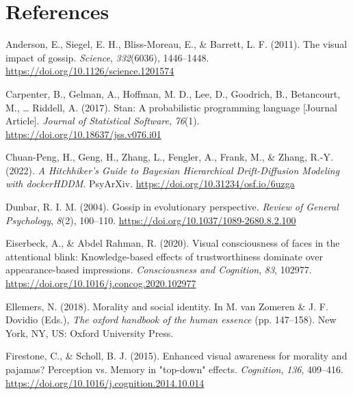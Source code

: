 \documentclass[
  man]{apa6}
\newlength{\cslhangindent}
\newlength{\cslentryspacingunit} %
\newenvironment{CSLReferences}[2] %
 {%
  \setlength{\parindent}{0pt}
  \ifodd #1
  \let\oldpar\par
  \def\par{\hangindent=\cslhangindent\oldpar}
  \fi
  \setlength{\parskip}{#2\cslentryspacingunit}
 }%
 {}
\begin{document}
\hypertarget{references}{%
\section{References}\label{references}}

\begingroup
\setlength{\parindent}{-0.5in}
\setlength{\leftskip}{0.5in}

\hypertarget{refs}{}
\begin{CSLReferences}{1}{0}
\leavevmode{}%
Anderson, E., Siegel, E. H., Bliss-Moreau, E., \& Barrett, L. F. (2011). The visual impact of gossip. \emph{Science}, \emph{332}(6036), 1446--1448. \url{https://doi.org/10.1126/science.1201574}

\leavevmode{}%
Carpenter, B., Gelman, A., Hoffman, M. D., Lee, D., Goodrich, B., Betancourt, M., \ldots{} Riddell, A. (2017). Stan: A probabilistic programming language {[}Journal Article{]}. \emph{Journal of Statistical Software}, \emph{76}(1). \url{https://doi.org/10.18637/jss.v076.i01}

\leavevmode{}%
Chuan-Peng, H., Geng, H., Zhang, L., Fengler, A., Frank, M., \& Zhang, R.-Y. (2022). \emph{A {Hitchhiker}'s {Guide} to {Bayesian} {Hierarchical} {Drift}-{Diffusion} {Modeling} with {dockerHDDM}}. PsyArXiv. \url{https://doi.org/10.31234/osf.io/6uzga}

\leavevmode{}%
Dunbar, R. I. M. (2004). Gossip in evolutionary perspective. \emph{Review of General Psychology}, \emph{8}(2), 100--110. \url{https://doi.org/10.1037/1089-2680.8.2.100}

\leavevmode{}%
Eiserbeck, A., \& Abdel Rahman, R. (2020). Visual consciousness of faces in the attentional blink: Knowledge-based effects of trustworthiness dominate over appearance-based impressions. \emph{Consciousness and Cognition}, \emph{83}, 102977. \url{https://doi.org/10.1016/j.concog.2020.102977}

\leavevmode{}%
Ellemers, N. (2018). Morality and social identity. In M. van Zomeren \& J. F. Dovidio (Eds.), \emph{The oxford handbook of the human essence} (pp. 147--158). New York, {NY}, {US}: Oxford University Press.

\leavevmode{}%
Firestone, C., \& Scholl, B. J. (2015). Enhanced visual awareness for morality and pajamas? Perception vs. Memory in "top-down" effects. \emph{Cognition}, \emph{136}, 409--416. \url{https://doi.org/10.1016/j.cognition.2014.10.014}


\end{CSLReferences}
\end{document}
